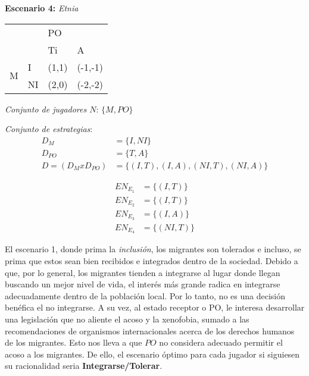 \documentclass{homework}
\begin{document}
    \textbf{Escenario 4:} \emph{Etnia}
\begin{table}[h!]
\begin{tabular}{|ll|ll|}
\hline
\multicolumn{2}{|l|}{\multirow{2}{*}{}} & \multicolumn{2}{l|}{PO} \\ \cline{3-4} 
\multicolumn{2}{|l|}{} & \multicolumn{1}{l|}{Ti} & A \\ \hline
\multicolumn{1}{|c|}{\multirow{2}{*}{M}} & I & \multicolumn{1}{l|}{(1,1)} & (-1,-1) \\ \cline{2-4} 
\multicolumn{1}{|c|}{} & NI & \multicolumn{1}{l|}{(2,0)} & (-2,-2) \\ \hline
\end{tabular}
\end{table}



\emph{Conjunto de jugadores $N$}: $\{ M, PO\}$

\emph{Conjunto de estrategias}:
\begin{equation}
\begin{split}
    D_M & =  \{ I, NI\} \\
    D_{PO} & = \{ T, A\} \\
    D = (D_M x D_{PO}) &= \{ (I, T), (I, A), (NI, T), (NI, A) \}
\end{split}
\end{equation}




\begin{equation}
\begin{split}
    EN_{E_1} &= \{ (I,T)\} \\
    EN_{E_2} &= \{ (I,T)\}  \\
    EN_{E_3} &= \{ (I,A)\} \\
    EN_{E_4} &= \{ (NI,T)\} 
\end{split}
\end{equation}


El escenario 1, donde prima la \emph{inclusión}, los migrantes son tolerados e incluso, se prima que estos sean bien recibidos e integrados dentro de la sociedad. Debido a que, por lo general, los migrantes tienden a integrarse al lugar donde llegan buscando un mejor nivel de vida, el interés más grande radica en integrarse adecuadamente dentro de la población local. Por lo tanto, no es una decisión benéfica el no integrarse. A su vez, al estado receptor o PO, le interesa desarrollar una legislación que no aliente el acoso y la xenofobia, sumado a las recomendaciones de organismos internacionales acerca de los derechos humanos de los migrantes. Esto nos lleva a que $PO$ no considera adecuado permitir el acoso a los migrantes. De ello, el escenario óptimo para cada jugador si siguiesen su racionalidad seria \textbf{Integrarse/Tolerar}. \newline
\end{document}
